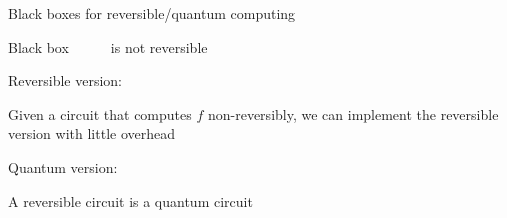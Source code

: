 \begin{frame}{Black boxes for reversible/quantum computing}

Black box ~~
     \hspace{2em}
~~ is not reversible
  
  \pause
  \bigskip
  
Reversible version: ~~
  
  \pause
  \bigskip
  
Given a circuit that computes $f$ non-reversibly, we can implement the reversible version with little overhead

  \pause
  \bigskip
  
Quantum version: ~~

  \pause
  \bigskip

A reversible circuit is a quantum circuit

\end{frame}


